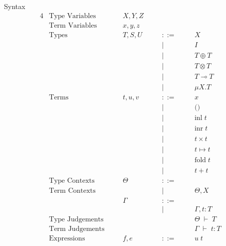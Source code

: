 \documentclass[10pt]{jsarticle}
\newcommand{\sequent}[2]{#1 \;\vdash\; #2}
\newcommand{\bnfdef}{::=}
\begin{document}
\begin{itembox}[c]{Syntax}
  \begin{alignat*}{4}
    &\text{Type Variables}  & \quad &X,Y,Z  & \quad &        & \quad & \\
    &\text{Term Variables}  &       &x,y,z  &       &        &       & \\
    &\text{Types}           &       &T,S,U  &       &\bnfdef &       & X \\
    &                       &       &       &       &|       &       & I \\
    &                       &       &       &       &|       &       & T \oplus T \\
    &                       &       &       &       &|       &       & T \otimes T \\
    &                       &       &       &       &|       &       & T \multimap T \\
    &                       &       &       &       &|       &       & \mu{X}.T \\
    &\text{Terms}           &       &t,u,v  &       &\bnfdef &       & x \\
    &                       &       &       &       &|       &       & \text{()} \\
    &                       &       &       &       &|       &       & \text{inl}\;t \\
    &                       &       &       &       &|       &       & \text{inr}\;t \\
    &                       &       &       &       &|       &       & t\times{}t \\
    &                       &       &       &       &|       &       & t\mapsto{}t \\
    &                       &       &       &       &|       &       & \text{fold}\;t \\
    &                       &       &       &       &|       &       & t+t \\
    &\text{Type Contexts}   &       &\Theta &       &\bnfdef &       & \\
    &\text{Term Contexts}   &       &       &       &|       &       & \Theta,X \\
    &                       &       &\Gamma &       &\bnfdef &       & \\
    &                       &       &       &       &|       &       & \Gamma,t:T \\
    &\text{Type Judgements} &       &       &       &        &       & \sequent{\Theta}{T} \\
    &\text{Term Judgements} &       &       &       &        &       & \sequent{\Gamma}{t:T} \\
    &\text{Expressions}     &       &f,e    &       &\bnfdef &       & u\;t
  \end{alignat*}
\end{itembox}
\end{document}
